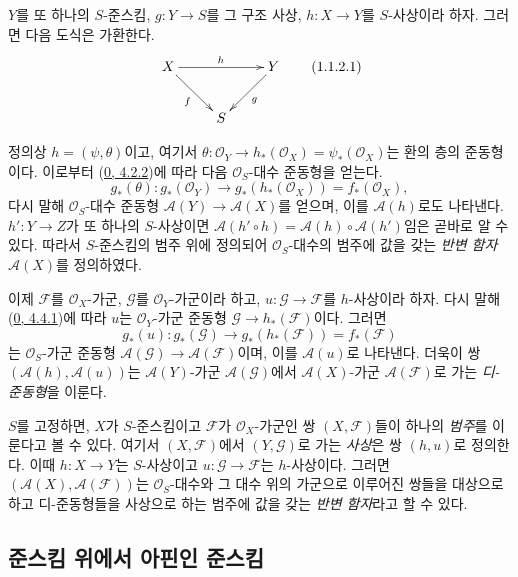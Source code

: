 \begin{env}[1.1.2]
\label{II.1.1.2-ko}
$Y$를 또 하나의 $S$-준스킴, $g:Y\to S$를 그 구조 사상,
$h:X\to Y$를 $S$-사상이라 하자. 그러면 다음 도식은 가환한다.
\[
  \xymatrix{
    X\ar[rr]^h\ar[rd]_f && Y\ar[ld]^g\\
    & S
  }
  \tag{1.1.2.1}\label{II.1.1.2.1-ko}
\]

정의상 $h=(\psi,\theta)$이고, 여기서
$\theta:\mathcal{O}_Y\to h_*(\mathcal{O}_X)=\psi_*(\mathcal{O}_X)$는
환의 층의 준동형이다. 이로부터
(\hyperref[0.4.2.2-ko]{0, 4.2.2})에 따라 다음
$\mathcal{O}_S$-대수 준동형을 얻는다.
\[
  g_*(\theta):g_*(\mathcal{O}_Y)\to
  g_*(h_*(\mathcal{O}_X))=f_*(\mathcal{O}_X),
\]
다시 말해 $\mathcal{O}_S$-대수 준동형
$\mathcal{A}(Y)\to\mathcal{A}(X)$를 얻으며, 이를
$\mathcal{A}(h)$로도 나타낸다. $h':Y\to Z$가 또 하나의
$S$-사상이면
$\mathcal{A}(h'\circ h)=\mathcal{A}(h)\circ\mathcal{A}(h')$임은
곧바로 알 수 있다. 따라서 $S$-준스킴의 범주 위에 정의되어
$\mathcal{O}_S$-대수의 범주에 값을 갖는 \emph{반변 함자}
$\mathcal{A}(X)$를 정의하였다.

이제 $\mathcal{F}$를 $\mathcal{O}_X$-가군, $\mathcal{G}$를
$\mathcal{O}_Y$-가군이라 하고, $u:\mathcal{G}\to\mathcal{F}$를
$h$-사상이라 하자. 다시 말해
(\hyperref[0.4.4.1-ko]{0, 4.4.1})에 따라 $u$는
$\mathcal{O}_Y$-가군 준동형
$\mathcal{G}\to h_*(\mathcal{F})$이다. 그러면
\[
  g_*(u):g_*(\mathcal{G})\to g_*(h_*(\mathcal{F}))=f_*(\mathcal{F})
\]
는 $\mathcal{O}_S$-가군 준동형
$\mathcal{A}(\mathcal{G})\to\mathcal{A}(\mathcal{F})$이며, 이를
$\mathcal{A}(u)$로 나타낸다. 더욱이 쌍
$(\mathcal{A}(h),\mathcal{A}(u))$는
$\mathcal{A}(Y)$-가군 $\mathcal{A}(\mathcal{G})$에서
$\mathcal{A}(X)$-가군 $\mathcal{A}(\mathcal{F})$로 가는
\emph{디-준동형}을 이룬다.
\end{env}

\begin{env}[1.1.3]
\label{II.1.1.3-ko}
$S$를 고정하면, $X$가 $S$-준스킴이고 $\mathcal{F}$가
$\mathcal{O}_X$-가군인 쌍 $(X,\mathcal{F})$들이 하나의
\emph{범주}를 이룬다고 볼 수 있다. 여기서
$(X,\mathcal{F})$에서 $(Y,\mathcal{G})$로 가는 \emph{사상}은 쌍
$(h,u)$로 정의한다. 이때 $h:X\to Y$는 $S$-사상이고
$u:\mathcal{G}\to\mathcal{F}$는 $h$-사상이다. 그러면
$(\mathcal{A}(X),\mathcal{A}(\mathcal{F}))$는
$\mathcal{O}_S$-대수와 그 대수 위의 가군으로 이루어진 쌍들을
대상으로 하고 디-준동형들을 사상으로 하는 범주에 값을 갖는
\emph{반변 함자}라고 할 수 있다.
\end{env}

\subsection{준스킴 위에서 아핀인 준스킴}
\label{subsection:II.1.2-ko}

